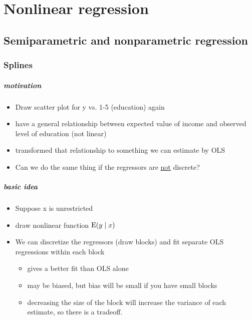 

\chapter{Nonlinear regression}

\section{Semiparametric and nonparametric regression}

\subsection{Splines}

\paragraph{motivation}
\begin{itemize}
\item Draw scatter plot for y vs. 1-5 (education) again
\item have a general relationship between expected value of income
         and observed level of education (not linear)
\item transformed that relationship to something we can estimate by
         OLS
\item Can we do the same thing if the regressors are \underline{not}
         discrete?
\end{itemize}

\paragraph{basic idea}
\begin{itemize}
\item Suppose x is unrestricted
\item draw nonlinear function $\operatorname{E}(y \mid x)$
\item We can discretize the regressors (draw blocks) and fit
         separate OLS regressions within each block
\begin{itemize}
\item gives a better fit than OLS alone
\item may be biased, but bias will be small if you have small
           blocks
\item decreasing the size of the block will increase the variance
           of each estimate, so there is a tradeoff.
\end{itemize}
\end{itemize}

